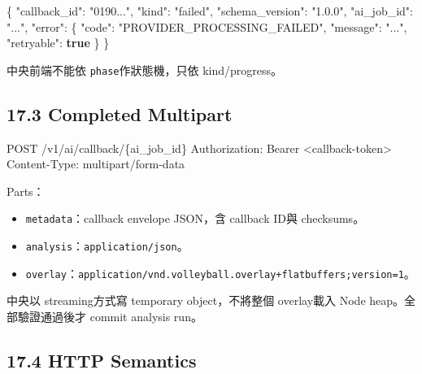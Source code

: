 \documentclass[
  9pt,
  a4paper,
]{article}
\newenvironment{Shaded}{}{}
\newcommand{\DataTypeTok}[1]{\textcolor[rgb]{0.56,0.13,0.00}{#1}}
\newcommand{\FunctionTok}[1]{\textcolor[rgb]{0.02,0.16,0.49}{#1}}
\newcommand{\KeywordTok}[1]{\textcolor[rgb]{0.00,0.44,0.13}{\textbf{#1}}}
\newcommand{\NormalTok}[1]{#1}
\newcommand{\StringTok}[1]{\textcolor[rgb]{0.25,0.44,0.63}{#1}}
\providecommand{\tightlist}{%
  \setlength{\itemsep}{0pt}\setlength{\parskip}{0pt}}
\begin{document}
\begin{Shaded}
\begin{Highlighting}[]
\FunctionTok{\{}
  \DataTypeTok{"callback\_\allowbreak{}id"}\FunctionTok{:} \StringTok{"0190..."}\FunctionTok{,}
  \DataTypeTok{"kind"}\FunctionTok{:} \StringTok{"failed"}\FunctionTok{,}
  \DataTypeTok{"schema\_\allowbreak{}version"}\FunctionTok{:} \StringTok{"1.0.0"}\FunctionTok{,}
  \DataTypeTok{"ai\_\allowbreak{}job\_\allowbreak{}id"}\FunctionTok{:} \StringTok{"..."}\FunctionTok{,}
  \DataTypeTok{"error"}\FunctionTok{:} \FunctionTok{\{}
    \DataTypeTok{"code"}\FunctionTok{:} \StringTok{"PROVIDER\_\allowbreak{}PROCESSING\_\allowbreak{}FAILED"}\FunctionTok{,}
    \DataTypeTok{"message"}\FunctionTok{:} \StringTok{"..."}\FunctionTok{,}
    \DataTypeTok{"retryable"}\FunctionTok{:} \KeywordTok{true}
  \FunctionTok{\}}
\FunctionTok{\}}
\end{Highlighting}
\end{Shaded}

中央前端不能依 \texttt{phase}作狀態機，只依 kind/progress。

\subsection{17.3 Completed Multipart}\label{173-completed-multipart}

\begin{Shaded}
\begin{Highlighting}[]
\NormalTok{POST /v1/ai/callback/\{ai\_\allowbreak{}job\_\allowbreak{}id\}}
\NormalTok{Authorization: Bearer \textless{}callback{-}token\textgreater{}}
\NormalTok{Content{-}Type: multipart/form{-}data}
\end{Highlighting}
\end{Shaded}

Parts：

\begin{itemize}
\tightlist
\item
  \texttt{metadata}：callback envelope JSON，含 callback ID與
  checksums。
\item
  \texttt{analysis}：\texttt{application/json}。
\item
  \texttt{overlay}：\texttt{application/vnd.volleyball.overlay+flatbuffers;version=1}。
\end{itemize}

中央以 streaming方式寫 temporary object，不將整個 overlay載入 Node
heap。全部驗證通過後才 commit analysis run。

\subsection{17.4 HTTP Semantics}\label{174-http-semantics}
\end{document}
